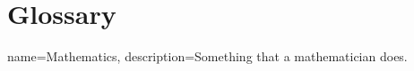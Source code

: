 \chapter*{Glossary}

{
    name={Mathematics},
    description={Something that a mathematician does.}
}